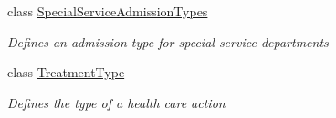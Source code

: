 \begin{DoxyCompactItemize}
class \hyperlink{class_general_health_care_elements_1_1_treatment_admission_types_1_1_special_service_admission_types}{Special\+Service\+Admission\+Types}
\begin{DoxyCompactList}\small\item\em Defines an admission type for special service departments \end{DoxyCompactList}\item 
class \hyperlink{class_general_health_care_elements_1_1_treatment_admission_types_1_1_treatment_type}{Treatment\+Type}
\begin{DoxyCompactList}\small\item\em Defines the type of a health care action \end{DoxyCompactList}\end{DoxyCompactItemize}
